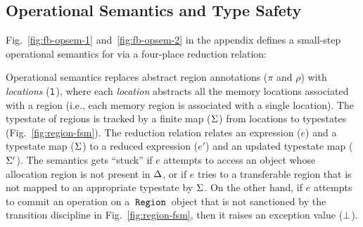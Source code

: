 \subsection{Operational Semantics and Type Safety}
\label{sec:fb-opsem}

Fig.~\ref{fig:fb-opsem-1} and~\ref{fig:fb-opsem-2} in the appendix
defines a small-step operational semantics for \fbname via a
four-place reduction relation:
\begin{smathpar}
\end{smathpar}
Operational semantics replaces abstract region annotations ($\pi$ and
$\rho$) with \emph{locations} ($\mathtt{l}$), where each \emph{location}
abstracts all the memory locations associated with a region (i.e.,
each memory region is associated with a single location). The
typestate of regions is tracked by a finite map ($\Sigma$) from
locations to typestates (Fig.~\ref{fig:region-fsm}). The reduction
relation relates an expression ($e$) and a typestate map ($\Sigma$) to a
reduced expression ($e'$) and an updated typestate map ($\Sigma'$). The
semantics gets ``stuck'' if $e$ attempts to access an object whose
allocation region is not present in $\Delta$, or if $e$ tries to
 a transferable region that is not mapped to an appropriate
typestate by $\Sigma$.  On the other hand, if $e$ attempts to commit an
operation on a $\,{\tt Region}\,$ object that is not sanctioned by the transition
discipline in Fig.~\ref{fig:region-fsm}, then it raises an exception
value ($\bot$).

